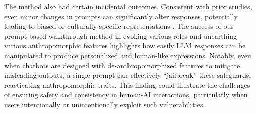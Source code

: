 The method also had certain incidental outcomes. Consistent with prior studies, even minor changes in prompts can significantly alter responses, potentially leading to biased or culturally specific representations \citep{cheng-etal-2023-marked, tao2024cultural}. The success of our prompt-based walkthrough method in evoking various roles and unearthing various anthropomorphic features highlights how easily LLM responses can be manipulated to produce personalized and human-like expressions. Notably, even when chatbots are designed with de-anthropomorphized features to mitigate misleading outputs, a single prompt can effectively ``jailbreak'' these safeguards, reactivating anthropomorphic traits. This finding could illustrate the challenges of ensuring safety and consistency in human-AI interactions, particularly when users intentionally or unintentionally exploit such vulnerabilities.






